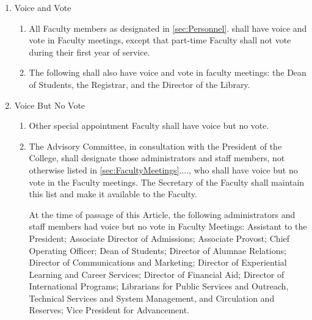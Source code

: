 \documentclass{manual}
\newcommand{\itemLevelA}{\alph*.}
\newcommand{\itemLevelB}{\arabic*)}
\newcommand{\itemRefA}{\alph*}
\newcommand{\itemRefB}{\arabic*}
\begin{document}
\begin{enumerate}[label=\itemLevelA,ref=\itemRefA]
\item \label{item:voiceAnVote03} Voice and Vote
\begin{enumerate}[label=\itemLevelB,ref=\itemRefB]
\item All Faculty members as designated in \cref{sec:Personnel}. shall have voice and vote in Faculty meetings, except that part-time Faculty shall not vote during their first year of service.
\item \label{iitem:admins04} The following shall also have voice and vote in faculty meetings: the Dean of Students, the Registrar, and the Director of the Library.
\end{enumerate}

\item Voice But No Vote
\begin{enumerate}[label=\itemLevelB,ref=\itemRefB]
\item Other special appointment Faculty shall have voice but no vote.
\item The Advisory Committee, in consultation with the President of the College, shall designate those administrators and staff members, not otherwise listed in \cref{sec:FacultyMeetings}...., who shall have voice but no vote in the Faculty meetings. The Secretary of the Faculty shall maintain this list and make it available to the Faculty.

At the time of passage of this Article, the following administrators and staff members had voice but no vote in Faculty Meetings: 
Assistant to the President; 
Associate Director of Admissions; 
Associate Provost; 
Chief Operating Officer; 
Dean of Students; 
Director of Alumnae Relations; 
Director of Communications and Marketing; 
Director of Experiential Learning and Career Services; 
Director of Financial Aid; 
Director of International Programs; 
Librarians for Public Services and Outreach, Technical Services and System Management, and Circulation and Reserves; 
Vice President for Advancement. 
\end{enumerate}
\end{enumerate}

\end{document}

